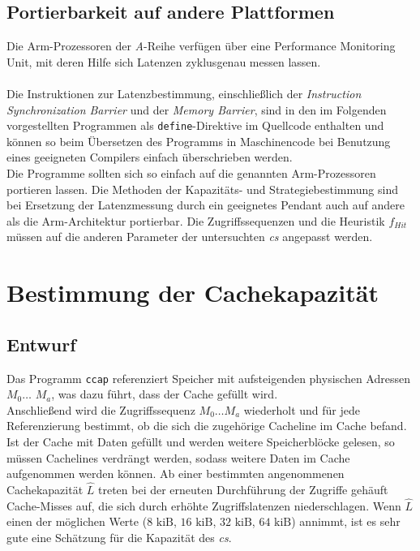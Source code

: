\documentclass[]{scrbook}
\begin{document}
\section{Portierbarkeit auf andere Plattformen} \label{port}

Die Arm-Prozessoren der \textit{A}-Reihe verfügen über eine Performance Monitoring Unit, mit deren Hilfe sich Latenzen zyklusgenau messen lassen.\\
\cite{a9,a78ae,a72,a78c,a5}
\\
Die Instruktionen zur Latenzbestimmung, einschließlich der \textit{Instruction Synchronization Barrier} und der \textit{Memory Barrier}, sind in den im Folgenden vorgestellten Programmen als \texttt{define}-Direktive im Quellcode enthalten und können so beim Übersetzen des Programms in Maschinencode bei Benutzung eines geeigneten Compilers einfach überschrieben werden.\\
Die Programme sollten sich so einfach auf die genannten Arm-Prozessoren portieren lassen.
Die Methoden der Kapazitäts- und Strategiebestimmung sind bei Ersetzung der Latenzmessung durch ein geeignetes Pendant auch auf andere als die Arm-Architektur portierbar.
Die Zugriffssequenzen und die Heuristik $f_{Hit}$ müssen auf die anderen Parameter der untersuchten \textsl{\gls{c}s} angepasst werden.

\chapter{Bestimmung der Cachekapazität}\label{cap3}

\section{Entwurf}

Das Programm \texttt{ccap} referenziert Speicher mit aufsteigenden physischen Adressen $M_0 \dots$ $M_a$, was dazu führt, dass der Cache gefüllt wird.
\\
Anschließend wird die Zugriffssequenz $M_0 \dots M_a$ wiederholt und für jede Referenzierung bestimmt, ob die sich die zugehörige Cacheline im Cache befand.
\\
Ist der Cache mit Daten gefüllt und werden weitere Speicherblöcke gelesen, so müssen Cachelines verdrängt werden, sodass weitere Daten im Cache aufgenommen werden können.
Ab einer bestimmten angenommenen Cachekapazität $\hat{L}$ treten bei der erneuten Durchführung der Zugriffe gehäuft Cache-Misses auf, die sich durch erhöhte Zugriffslatenzen niederschlagen.
Wenn $\hat{L}$ einen der möglichen Werte ($8 \textrm{ kiB}$, $16 \textrm{ kiB}$, $32 \textrm{ kiB}$, $64 \textrm{ kiB}$) annimmt, ist es sehr gute eine Schätzung für die Kapazität des \textsl{\gls{c}s}. 
\end{document}
